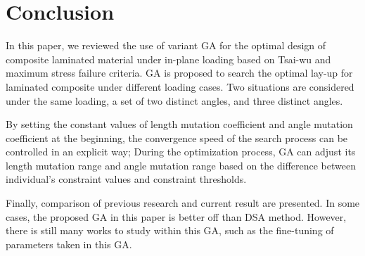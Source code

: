 \section{Conclusion}
In this paper, we reviewed the use of variant GA for the optimal design of composite
laminated material under in-plane loading based on Tsai-wu and maximum stress
failure criteria. GA is proposed to search the optimal lay-up for laminated
composite under different loading cases. Two situations are considered under the same
loading, a set of two distinct angles, and three distinct angles. 

By setting the constant values of length mutation coefficient and angle mutation
coefficient at the beginning, the convergence speed of the search process can be
controlled in an explicit way; During the optimization process, GA can adjust
its length mutation range and angle mutation range based on the difference
between individual's constraint values and constraint thresholds.  

Finally, comparison of previous research and current result are presented. In
some cases, the proposed GA in this paper is better off than DSA method.
However, there is still many works to study within this GA, such as the
fine-tuning of parameters taken in this GA.



